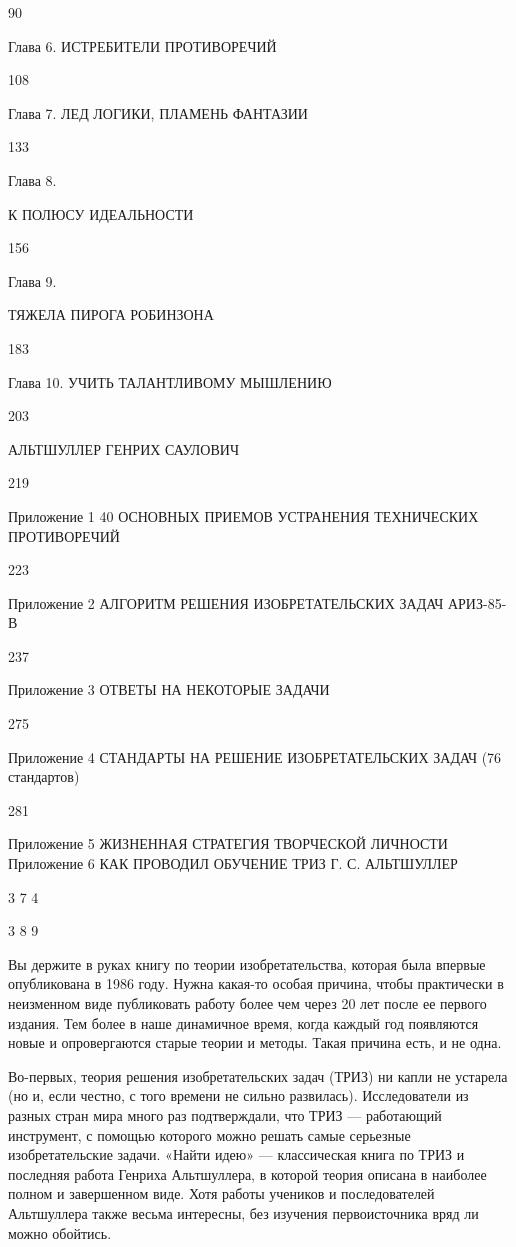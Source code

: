 90


Глава 6. ИСТРЕБИТЕЛИ ПРОТИВОРЕЧИЙ


108


Глава 7. ЛЕД ЛОГИКИ, ПЛАМЕНЬ ФАНТАЗИИ


133


Глава 8.


К ПОЛЮСУ ИДЕАЛЬНОСТИ


156


Глава 9.


ТЯЖЕЛА ПИРОГА РОБИНЗОНА


183


Глава 10. УЧИТЬ ТАЛАНТЛИВОМУ МЫШЛЕНИЮ


203


АЛЬТШУЛЛЕР ГЕНРИХ САУЛОВИЧ


219


Приложение 1
40 ОСНОВНЫХ ПРИЕМОВ УСТРАНЕНИЯ
ТЕХНИЧЕСКИХ ПРОТИВОРЕЧИЙ


223


Приложение 2
АЛГОРИТМ РЕШЕНИЯ
ИЗОБРЕТАТЕЛЬСКИХ ЗАДАЧ АРИЗ-85-В


237


Приложение 3
ОТВЕТЫ НА НЕКОТОРЫЕ ЗАДАЧИ


275


Приложение 4
СТАНДАРТЫ НА РЕШЕНИЕ
ИЗОБРЕТАТЕЛЬСКИХ ЗАДАЧ (76 стандартов)


281


Приложение 5
ЖИЗНЕННАЯ СТРАТЕГИЯ
ТВОРЧЕСКОЙ ЛИЧНОСТИ
Приложение 6
КАК ПРОВОДИЛ ОБУЧЕНИЕ ТРИЗ
Г. С. АЛЬТШУЛЛЕР


3 7 4


3 8 9


Вы  держите в  руках книгу  по теории  изобретательства, которая  была
впервые опубликована в 1986 году. Нужна какая-то особая причина, чтобы
практически в  неизменном виде публиковать  работу более чем  через 20
лет после ее первого издания. Тем более в наше динамичное время, когда
каждый год  появляются новые и  опровергаются старые теории  и методы.
Такая причина есть, и не одна.

Во-первых, теория  решения изобретательских  задач (ТРИЗ) ни  капли не
устарела  (но и,  если честно,  с того  времени не  сильно развилась).
Исследователи из  разных стран мира  много раз подтверждали,  что ТРИЗ
—  работающий  инструмент,  с  помощью  которого  можно  решать  самые
серьезные изобретательские  задачи. «Найти идею» —  классическая книга
по  ТРИЗ и  последняя  работа Генриха  Альтшуллера,  в которой  теория
описана в  наиболее полном  и завершенном  виде. Хотя  работы учеников
и  последователей Альтшуллера  также  весьма  интересны, без  изучения
первоисточника вряд ли можно обойтись.

